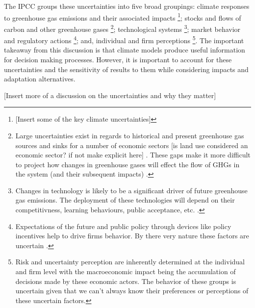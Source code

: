 \documentclass[10pt]{amsart}
\begin{document}
The IPCC groups these uncertainties into five broad groupings: climate responses to greenhouse gas emissions and their associated impacts \footnote{[Insert some of the key climate uncertainties]}; stocks and flows of carbon and other greenhouse gases \footnote{Large uncertainties exist in regards to historical and present greenhouse gas sources and sinks for a number of economic sectors [is land use considered an economic sector? if not make explicit here] \parencite{kunreuther2014integrated}. These gaps make it more difficult to project how changes in greenhouse gases will effect the flow of GHGs in the system (and their subsequent impacts) \parencite{kunreuther2014integrated}.}; technological systems \footnote{Changes in technology is likely to be a significant driver of future greenhouse gas emissions. The deployment of these technologies will depend on their competitivness, learning behaviours, public acceptance, etc. \parencite{kunreuther2014integrated}.}; market behavior and regulatory actions \footnote{Expectations of the future and public policy through devices like policy incentives help to drive firms behavior. By there very nature these factors are uncertain \parencite{kunreuther2014integrated}.}; and, individual and firm perceptions \parencite{kunreuther2014integrated}\footnote{Risk and uncertainty perception are inherently determined at the individual and firm level with the macroeconomic impact being the accumulation of decisions made by these economic actors. The behavior of these groups is uncertain given that we can't always know their preferences or perceptions of these uncertain factors.}.
The important takeaway from this discussion is that climate models produce useful information for decision making processes.
However, it is important to account for these uncertainties and the sensitivity of results to them while considering impacts and adaptation alternatives. 

[Insert more of a discussion on the uncertainties and why they matter]
\end{document}
